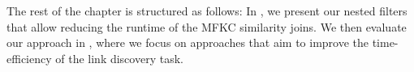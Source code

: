 The rest of the chapter is structured as follows: 
In , we present our nested filters that allow reducing the runtime of the MFKC similarity joins. We then evaluate our approach in , where we focus on approaches that aim to improve the time-efficiency of the link discovery task. 





